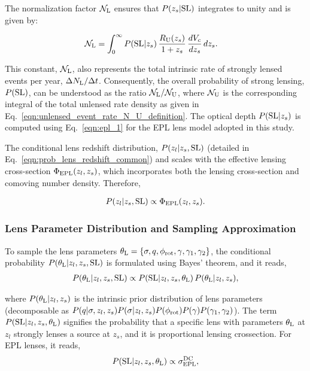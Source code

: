 \documentclass[aps,prd,twocolumn,superscriptaddress,groupedaddress,nofootinbib,showpacs,eqsecnum]{revtex4-1}
\begin{document}
The normalization factor ${\cal N}_{\rm L}$ ensures that $P(z_s | {\rm SL})$ integrates to unity and is given by:

\begin{align}
{\cal N}_{\rm L} &= \int_0^{\infty} P({\rm SL}|z_s) \, \frac{R_{\rm U}(z_s)}{1 + z_s} \, \frac{dV_c}{dz_s} \, dz_s.
\label{eqn:lensed_event_rate_z_4}
\end{align}

This constant, $\mathcal{N}_{\rm L}$, also represents the total intrinsic rate of strongly lensed events per year, $\Delta N_{\rm L} / \Delta t$. Consequently, the overall probability of strong lensing, $P({\rm SL})$, can be understood as the ratio $\mathcal{N}_{\rm L} / \mathcal{N}_{{\rm U}}$, where $\mathcal{N}_{{\rm U}}$ is the corresponding integral of the total unlensed rate density as given in Eq.~\ref{eqn:unlensed_event_rate_N_U_definition}. The optical depth $P({\rm SL}|z_s)$ is computed using Eq.~\eqref{eqn:epl_1} for the EPL lens model adopted in this study.

The conditional lens redshift distribution, $P(z_l | z_s, {\rm SL})$ (detailed in Eq.~\eqref{eqn:prob_lens_redshift_common}) and scales with the effective lensing cross-section $\Phi_{{\rm EPL}}(z_l, z_s)$, which incorporates both the lensing cross-section and comoving number density. Therefore,

\begin{align}
P(z_l|z_s, {\rm SL}) \propto \Phi_{{\rm EPL}}(z_l, z_s).
\end{align}

\subsubsection{Lens Parameter Distribution and Sampling Approximation}

To sample the lens parameters $\theta_{\rm L} = \{\sigma, q, \phi_{{\rm rot}}, \gamma, \gamma_1, \gamma_2\}$, the conditional probability $P(\theta_{\rm L}|z_l, z_s, {\rm SL})$ is formulated using Bayes' theorem, and it reads,
\begin{align}
P(\theta_{\rm L}|z_l, z_s, {\rm SL}) \propto P({\rm SL}|z_l, z_s, \theta_{\rm L}) \, P(\theta_{\rm L}|z_l, z_s),
\label{eqn:prob_thetaL_bayes}
\end{align}

where $P(\theta_{\rm L}|z_l, z_s)$ is the intrinsic prior distribution of lens parameters (decomposable as $P(q|\sigma, z_l, z_s) P(\sigma|z_l, z_s) P(\phi_{{\rm rot}}) P(\gamma) P(\gamma_1, \gamma_2)$). The term $P({\rm SL}|z_l, z_s, \theta_{\rm L})$ signifies the probability that a specific lens with parameters $\theta_{\rm L}$ at $z_l$ strongly lenses a source at $z_s$, and it is proportional lensing crossection. For EPL lenses, it reads,
\begin{align}
P({\rm SL}|z_l, z_s, \theta_{\rm L}) \propto \sigma^{{\rm DC}}_{{\rm EPL}},
\end{align}
\end{document}
